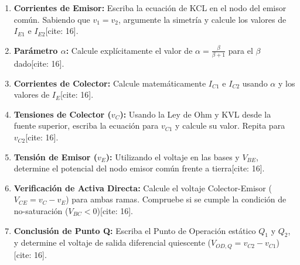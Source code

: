 \documentclass[11pt, a4paper]{article}
\begin{document}
\begin{enumerate}
    \item \textbf{Corrientes de Emisor:} Escriba la ecuación de KCL en el nodo del emisor común. Sabiendo que $v_1 = v_2$, argumente la simetría y calcule los valores de $I_{E1}$ e $I_{E2}$[cite: 16]. \vspace{1.5cm}
    \item \textbf{Parámetro $\alpha$:} Calcule explícitamente el valor de $\alpha = \frac{\beta}{\beta+1}$ para el $\beta$ dado[cite: 16]. \vspace{1cm}
    \item \textbf{Corrientes de Colector:} Calcule matemáticamente $I_{C1}$ e $I_{C2}$ usando $\alpha$ y los valores de $I_E$[cite: 16]. \vspace{1cm}
    \item \textbf{Tensiones de Colector ($v_C$):} Usando la Ley de Ohm y KVL desde la fuente superior, escriba la ecuación para $v_{C1}$ y calcule su valor. Repita para $v_{C2}$[cite: 16]. \vspace{1.5cm}
    \item \textbf{Tensión de Emisor ($v_E$):} Utilizando el voltaje en las bases y $V_{BE}$, determine el potencial del nodo emisor común frente a tierra[cite: 16]. \vspace{1cm}
    \item \textbf{Verificación de Activa Directa:} Calcule el voltaje Colector-Emisor ($V_{CE} = v_C - v_E$) para ambas ramas. Compruebe si se cumple la condición de no-saturación ($V_{BC} < 0$)[cite: 16]. \vspace{1.5cm}
    \item \textbf{Conclusión de Punto Q:} Escriba el Punto de Operación estático $Q_1$ y $Q_2$, y determine el voltaje de salida diferencial quiescente ($V_{OD,Q} = v_{C2} - v_{C1}$)[cite: 16].
\end{enumerate}
\end{document}
